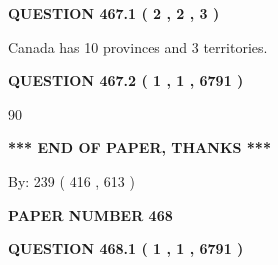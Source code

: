 \documentclass[12pt]{article}
\begin{document}
   
  
\vspace{0.2in}
  
{\textbf{\Large{QUESTION
467.1 
 ( 2 , 2 , 3 )
}}}
  
  
 
 
\noindent{}
 
 
Canada has 10  provinces and 3 territories.
 
 
 
 
  
\vspace{0.2in}
  
{\textbf{\Large{QUESTION
467.2 
 ( 1 , 1 , 6791 )
}}}
  
  
 
 
\noindent{}

90
 
 
   
   
 \vspace{0.2in}
 
   
   
   
   
\vspace{1.0in} 
{\textbf{\large{ *** END OF PAPER, THANKS *** }}} 
   
   
\hspace{1.0in} By: 
 239 ( 416 ,  613 )
   
   
   
   
\newpage 
\setcounter{page}{ 
   468001 } 
   
   
   
   
 {\textbf{ \Large{ PAPER NUMBER  468  }}}
   
   
\vspace{0.2in}
   
   
   
   
   
   
 \vspace{0.2in}
 
 
 
 
   
   
  
\vspace{0.2in}
  
{\textbf{\Large{QUESTION
468.1 
 ( 1 , 1 , 6791 )
}}}
  
\end{document}
